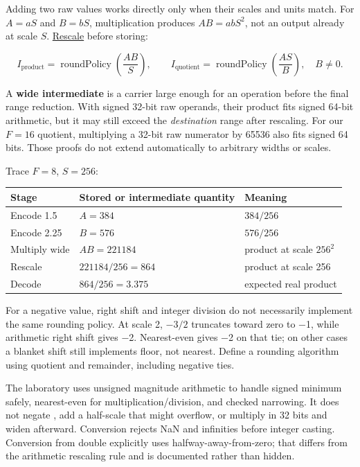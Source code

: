 \hypertarget{01-foundations-i-ch001-multiplication-changes-the-scale-rescaling-is-another-rounding-decision}{}

Adding two raw values works directly only when their scales and units match. For \(A=aS\) and \(B=bS\), multiplication produces \(AB=abS^2\), not an output already at scale \(S\). \hyperref[appendix-3333db47830f]{Rescale} before storing:

\[
I_{\mathrm{product}}=\operatorname{roundPolicy}\!\left(\frac{AB}{S}\right),
\qquad
I_{\mathrm{quotient}}=\operatorname{roundPolicy}\!\left(\frac{AS}{B}\right),\quad B\ne0.
\]

A \textbf{wide intermediate} is a carrier large enough for an operation before the final range reduction. With signed 32-bit raw operands, their product fits signed 64-bit arithmetic, but it may still exceed the \emph{destination} range after rescaling. For our \(F=16\) quotient, multiplying a 32-bit raw numerator by 65536 also fits signed 64 bits. Those proofs do not extend automatically to arbitrary widths or scales.

Trace \(F=8\), \(S=256\):

{\def\LTcaptype{none} %
\begin{longtable}[]{@{}lll@{}}
\toprule\noalign{}
Stage & Stored or intermediate quantity & Meaning \\
\midrule\noalign{}
\endhead
\bottomrule\noalign{}
\endlastfoot
Encode 1.5 & \(A=384\) & \(384/256\) \\
Encode 2.25 & \(B=576\) & \(576/256\) \\
Multiply wide & \(AB=221184\) & product at scale \(256^2\) \\
Rescale & \(221184/256=864\) & product at scale 256 \\
Decode & \(864/256=3.375\) & expected real product \\
\end{longtable}
}

For a negative value, right shift and integer division do not necessarily implement the same rounding policy. At scale 2, \(-3/2\) truncates toward zero to −1, while arithmetic right shift gives −2. Nearest-even gives −2 on that tie; on other cases a blanket shift still implements floor, not nearest. Define a rounding algorithm using quotient and remainder, including negative ties.

The laboratory uses unsigned magnitude arithmetic to handle signed minimum safely, nearest-even for multiplication/division, and checked narrowing. It does not negate , add a half-scale that might overflow, or multiply in 32 bits and widen afterward. Conversion rejects NaN and infinities before integer casting. Conversion from double explicitly uses halfway-away-from-zero; that differs from the arithmetic rescaling rule and is documented rather than hidden.

